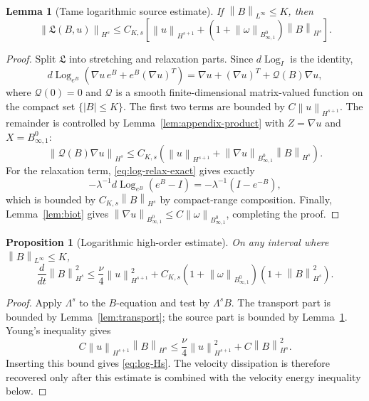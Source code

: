 \documentclass[10pt,a4paper]{amsart}
\numberwithin{equation}{section}
\newtheorem{proposition}[theorem]{Proposition}
\newtheorem{lemma}[theorem]{Lemma}
\newcommand{\Id}{I}
\newcommand{\Log}{\operatorname{Log}}
\newcommand{\Besov}{B^0_{\infty,1}}
\newcommand{\norm}[1]{\left\lVert #1\right\rVert}
\begin{document}
\begin{lemma}[Tame logarithmic source estimate]
\label{lem:log-source}
If \(\norm{B}_{L^\infty}\le K\), then
\begin{equation}
  \norm{\mathfrak L(B,u)}_{H^s}
  \le
  C_{K,s}
  \left[
  \norm{u}_{H^{s+1}}
  +(1+\norm{\omega}_{\Besov})\norm{B}_{H^s}
  \right].
  \label{eq:log-source}
\end{equation}
\end{lemma}

\begin{proof}
Split \(\mathfrak L\) into stretching and relaxation parts.  Since
\(d\Log_{\Id}\) is the identity,
\[
  d\Log_{e^B}\left(\nabla u\,e^B+e^B(\nabla u)^T\right)
  =
  \nabla u+(\nabla u)^T+\mathcal Q(B)\nabla u ,
\]
where \(\mathcal Q(0)=0\) and \(\mathcal Q\) is a smooth finite-dimensional
matrix-valued function on the compact set \(\{|B|\le K\}\).  The first two
terms are bounded by \(C\norm{u}_{H^{s+1}}\).  The remainder is controlled by
Lemma~\ref{lem:appendix-product} with \(Z=\nabla u\) and
\(X=B^0_{\infty,1}\):
\[
  \norm{\mathcal Q(B)\nabla u}_{H^s}
  \le
  C_{K,s}\left(
  \norm{u}_{H^{s+1}}
  +\norm{\nabla u}_{B^0_{\infty,1}}\norm{B}_{H^s}
  \right).
\]
For the relaxation term, \eqref{eq:log-relax-exact} gives exactly
\[
  -\lambda^{-1}d\Log_{e^B}(e^B-\Id)
  =
  -\lambda^{-1}(\Id-e^{-B}),
\]
which is bounded by \(C_{K,s}\norm{B}_{H^s}\) by compact-range composition.
Finally, Lemma~\ref{lem:biot} gives
\(\norm{\nabla u}_{B^0_{\infty,1}}\le C\norm{\omega}_{\Besov}\), completing
the proof.
\end{proof}

\begin{proposition}[Logarithmic high-order estimate]
\label{prop:log-Hs}
On any interval where \(\norm{B}_{L^\infty}\le K\),
\begin{equation}
  \frac{d}{dt}\norm{B}_{H^s}^2
  \le
  \frac{\nu}{4}\norm{u}_{H^{s+1}}^2
  +
  C_{K,s}(1+\norm{\omega}_{\Besov})(1+\norm{B}_{H^s}^2).
  \label{eq:log-Hs}
\end{equation}
\end{proposition}

\begin{proof}
Apply \(\Lambda^s\) to the \(B\)-equation and test by \(\Lambda^sB\).  The
transport part is bounded by Lemma~\ref{lem:transport}; the source part is
bounded by Lemma~\ref{lem:log-source}.  Young's inequality gives
\[
  C\norm{u}_{H^{s+1}}\norm{B}_{H^s}
  \le
  \frac{\nu}{4}\norm{u}_{H^{s+1}}^2+C\norm{B}_{H^s}^2 .
\]
Inserting this bound gives \eqref{eq:log-Hs}.  The velocity dissipation is
therefore recovered only after this estimate is combined with the velocity
energy inequality below.
\end{proof}
\end{document}

